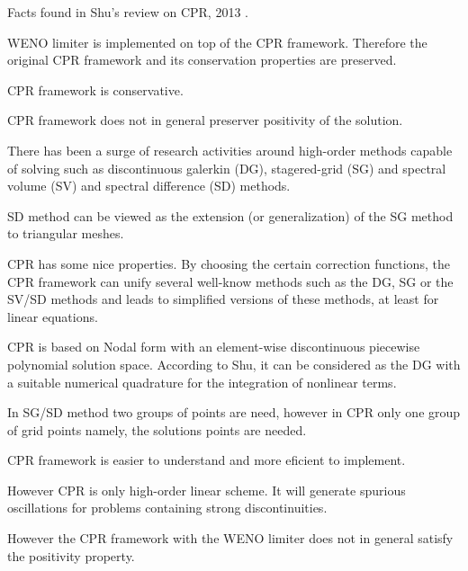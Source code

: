 \begin{frame}[allowframebreaks]
 Facts found in Shu's review on CPR, 2013 \cite{DuShu&Zhang2013}.
 \begin{orangeitemize}
  \item WENO limiter is implemented on top of the CPR framework. Therefore the original CPR framework and its conservation properties are preserved.  
  \item CPR framework is conservative.
  \item CPR framework does not in general preserver positivity of the solution.
  \item There has been a surge of research activities around high-order methods capable of solving such as discontinuous galerkin (DG), stagered-grid (SG) and spectral volume (SV) and spectral difference (SD) methods.
  \item SD method can be viewed as the extension (or generalization) of the SG method to triangular meshes.
  \item CPR has some nice properties. By choosing the certain correction functions, the CPR framework can unify several well-know methods such as the DG, SG or the SV/SD methods and leads to simplified versions of these methods, at least for linear equations.
  \item CPR is based on Nodal form with an element-wise discontinuous piecewise polynomial solution space. According to Shu, it can be considered as the DG with a suitable numerical quadrature for the integration of nonlinear terms.
  \item In SG/SD method two groups of points are need, however in CPR only one group of grid points namely, the solutions points are needed.
  \item CPR framework is easier to understand and more eficient to implement.
  \item However CPR is only high-order linear scheme. It will generate spurious oscillations for problems containing strong discontinuities.
  \item However the CPR framework with the WENO limiter does not in general satisfy the positivity property.
 \end{orangeitemize}
\end{frame}